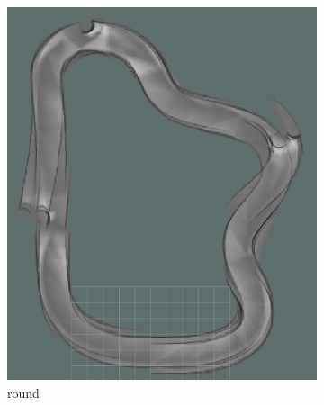 \begin{figure} 
	\centering
	\begin{subfigure}{.3\linewidth}
		\includegraphics[width=\textwidth]{Pictures/3slamtest1}
		\caption{ round}
		\end{subfigure}	
	\begin{subfigure}{.3\linewidth}

\end{subfigure}
\end{figure}

